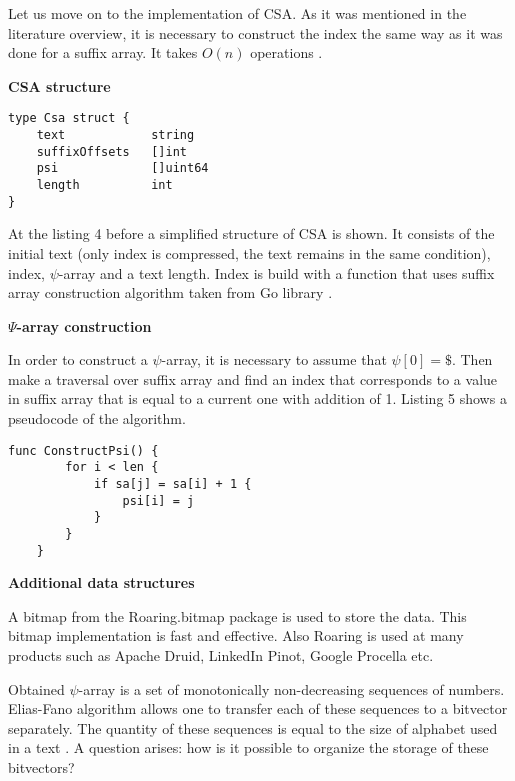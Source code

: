 
Let us move on to the implementation of CSA. As it was mentioned in the literature overview,
it is necessary to construct the index the same way as it was done for a suffix array.
It takes $O(n)$ operations \cite{huo2014practical}.

\textbf{CSA structure}

\begin{lstlisting}[caption=CSA structure]
type Csa struct {
	text            string
	suffixOffsets   []int
	psi             []uint64
	length          int
}
\end{lstlisting}

At the listing 4 before a simplified structure of CSA is shown. It consists of the initial text
(only index is compressed, the text remains in the same condition), index, $\psi$-array and a text length.
Index is build with a function that uses suffix array construction algorithm taken from Go library
\cite{golang2016sa}.

\textbf{$\Psi$-array construction}

In order to construct a $\psi$-array, it is necessary to assume that $\psi[0] = \$$. Then make
a traversal over suffix array and find an index that corresponds to a value in suffix array that is
equal to a current one with addition of 1. Listing 5 shows a pseudocode of the algorithm.

\begin{lstlisting}[caption=CSA construction]
	func ConstructPsi() {
		for i < len {
			if sa[j] = sa[i] + 1 {
				psi[i] = j
			}
		}
	}
\end{lstlisting}

\textbf{Additional data structures}

A bitmap from the Roaring.bitmap package \cite{chambi2016better} is used to store the data.
This bitmap implementation is fast and effective. Also Roaring is used at many products such as
Apache Druid, LinkedIn Pinot, Google Procella etc.

Obtained $\psi$-array is a set of monotonically non-decreasing sequences of numbers.
Elias-Fano algorithm allows one to transfer each of these sequences to a bitvector separately.
The quantity of these sequences is equal to the size of alphabet used in a text \cite{andersensimple}.
A question arises: how is it possible to organize the storage of these bitvectors?

